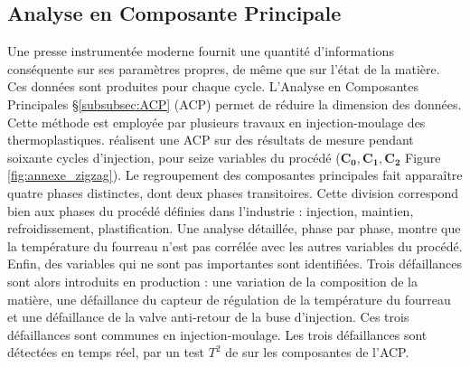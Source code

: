 \subsection{Analyse en Composante Principale}
Une presse instrumentée moderne fournit une quantité d’informations conséquente sur ses paramètres propres, de même que sur l’état de la matière.
Ces données sont produites pour chaque cycle.
L’Analyse en Composantes Principales §\ref{subsubsec:ACP} (ACP) permet de réduire la dimension des données.
Cette méthode est employée par plusieurs travaux en injection-moulage des thermoplastiques.
\citeauthor{lu_stagebased_2004} \cite{lu_stagebased_2004} réalisent une ACP sur des résultats de mesure pendant soixante cycles d'injection, pour seize variables du procédé ($\boldsymbol{C_0, C_1, C_2}$ Figure \ref{fig:annexe_zigzag}).
Le regroupement des composantes principales fait apparaître quatre phases distinctes, dont deux phases transitoires.
Cette division correspond bien aux phases du procédé définies dans l'industrie : injection, maintien, refroidissement, plastification.
Une analyse détaillée, phase par phase, montre que la température du fourreau n'est pas corrélée avec les autres variables du procédé.
Enfin, des variables qui ne sont pas importantes sont identifiées.
Trois défaillances sont alors introduits en production : une variation de la composition de la matière, une défaillance du capteur de régulation de la température du fourreau et une défaillance de la valve anti-retour de la buse d’injection.
Ces trois défaillances sont communes en injection-moulage.
Les trois défaillances sont détectées en temps réel, par un test $T^2$ de \citeauthor{hotelling_analysis_1933} \cite{hotelling_analysis_1933} sur les composantes de l'ACP.

